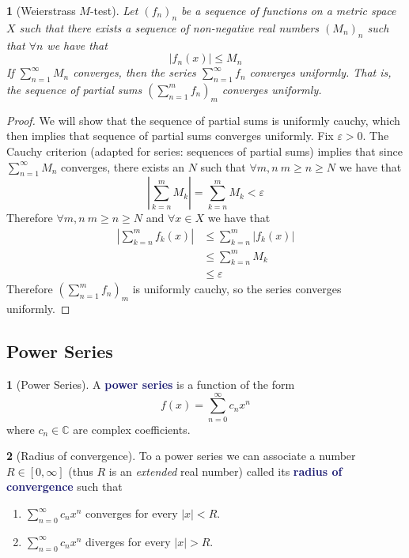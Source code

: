 \documentclass[12pt]{article}
\numberwithin{equation}{section}
\newcommand{\navy}[1]{\textcolor{MidnightBlue}{\bf #1}}
\theoremstyle{plain}
\newtheorem{theorem}{\color{ForestGreen}{\textbf{Theorem}}}[section]
\theoremstyle{definition}
\newtheorem{definition}{\color{MidnightBlue}{\textbf{Definition}}}[section]
\newcommand\abs[1]{\left| #1 \right|}
\newcommand{\1}{\mathbbm 1}
\newcommand{\e}{\varepsilon}
\newcommand{\CC}{\mathbb C}
\begin{document}
\begin{theorem}[Weierstrass $M$-test]
	Let $(f_n)_n$ be a sequence of functions on a metric space $X$ such that there exists a sequence of non-negative real numbers $(M_n)_n$ such that $\forall n$ we have that
	\begin{equation}
		|f_n(x)| \leq M_n 
	\end{equation}
	If $\sum_{n=1}^\infty M_n$ converges, then the series $\sum_{n=1}^\infty f_n$ converges uniformly. That is, the sequence of partial sums $\left(\sum_{n=1}^m f_n\right)_m$ converges uniformly.  
\end{theorem}
\begin{proof}
	We will show that the sequence of partial sums is uniformly cauchy, which then implies that sequence of partial sums converges uniformly. Fix $\e > 0$. The Cauchy criterion (adapted for series: sequences of partial sums) implies that since $\sum_{n=1}^\infty M_n$ converges, there exists an $N$ such that $\forall m,n \ m\geq n\geq N$ we have that
	\begin{equation*}
		\abs{\sum_{k=n}^m M_k} = \sum_{k=n}^m M_k  < \e
	\end{equation*}
	Therefore $\forall m,n \ m\geq n\geq N$ and $\forall x \in X$ we have that
	\begin{align*}
		\abs{\sum_{k=n}^m f_k(x)} &\leq \sum_{k=n}^m \abs{f_k(x)} \tag{$\Delta$} \\
		&\leq \sum_{k=n}^m M_k \\
		&\leq \e
	\end{align*}
	Therefore $\left(\sum_{n=1}^m f_n\right)_m$ is uniformly cauchy, so the series converges uniformly. 
\end{proof}

\subsection{Power Series}

\begin{definition}[Power Series]
	A \navy{power series} is a function of the form
	\begin{equation}
		f(x) = \sum_{n=0}^\infty c_n x^n
	\end{equation}
	where $c_n \in \CC$ are complex coefficients. 
\end{definition}

\begin{definition}[Radius of convergence]
	To a power series we can associate a number $R \in [0, \infty]$ (thus $R$ is an \emph{extended} real number) called its \navy{radius of convergence} such that  
	\begin{enumerate}
		\item $\sum_{n=0}^\infty c_n x^n$ converges for every $|x| < R$.
		\item $\sum_{n=0}^\infty c_n x^n$ diverges for every $|x| > R$.
	\end{enumerate}
\end{definition}
\end{document}
